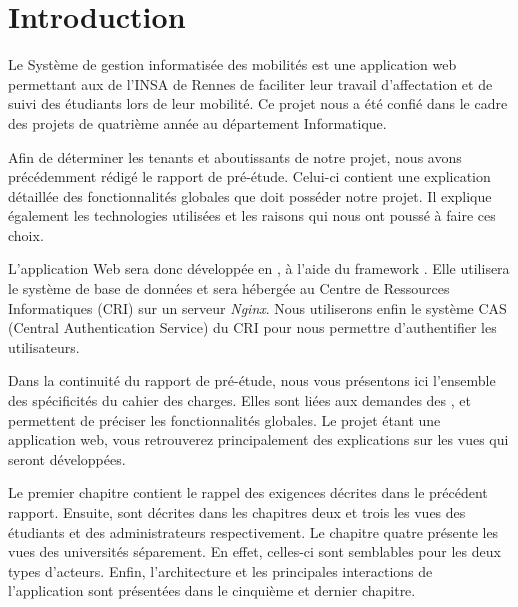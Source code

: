 \chapter*{Introduction}

Le Système de gestion informatisée des mobilités est une application web permettant aux \ris de l'INSA de Rennes de faciliter leur travail d'affectation et de suivi des étudiants lors de leur mobilité. Ce projet nous a été confié dans le cadre des projets de quatrième année au département Informatique.

\bigbreak

Afin de déterminer les tenants et aboutissants de notre projet, nous avons précédemment rédigé le rapport de pré-étude. Celui-ci contient une explication détaillée des fonctionnalités globales que doit posséder notre projet. Il explique également les technologies utilisées et les raisons qui nous ont poussé à faire ces choix. 

L'application Web sera donc développée en \php, à l'aide du framework \symfony. Elle utilisera le système de base de données \mdb et sera hébergée au Centre de Ressources Informatiques (CRI) sur un serveur \textit{Nginx}. Nous utiliserons enfin le système CAS (Central Authentication Service) du CRI pour nous permettre d'authentifier les utilisateurs.

\bigbreak

Dans la continuité du rapport de pré-étude, nous vous présentons ici l'ensemble des spécificités du cahier des charges. Elles sont liées aux demandes des \ris, et permettent de préciser les fonctionnalités globales. Le projet étant une application web, vous retrouverez principalement des explications sur les vues qui seront développées. 

Le premier chapitre contient le rappel des exigences décrites dans le précédent rapport. Ensuite, sont décrites dans les chapitres deux et trois les vues des étudiants et des administrateurs respectivement. Le chapitre quatre présente les vues des universités séparement. En effet, celles-ci sont semblables pour les deux types d'acteurs. Enfin, l'architecture et les principales interactions de l'application sont présentées dans le cinquième et dernier chapitre.
